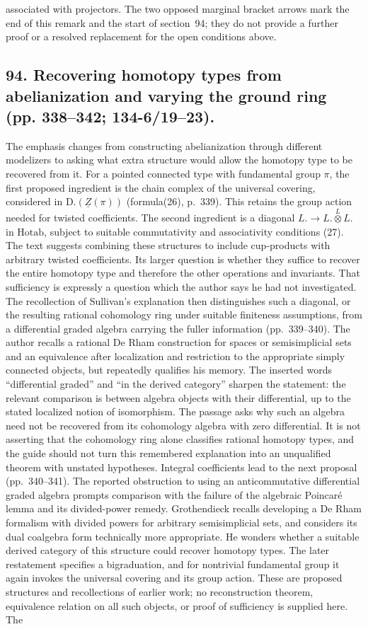 \documentclass[10pt,oneside]{book}
\begin{document}
associated with projectors. The two opposed marginal bracket arrows mark the end of this remark and the start of section~94; they do not provide a further proof or a resolved replacement for the open conditions above.

\subsection*{94. Recovering homotopy types from abelianization and varying the ground ring (pp. 338--342; 134-6/19--23).}
The emphasis changes from constructing abelianization through different modelizers to asking what extra structure would allow the homotopy type to be recovered from it. For a pointed connected type with fundamental group $\pi$, the first proposed ingredient is the chain complex of the universal covering, considered in $\mathrm{D.}(\underline Z(\pi))$ (formula(26), p.~339). This retains the group action needed for twisted coefficients. The second ingredient is a diagonal $L.\to L.\overset{L}{\otimes}L.$ in $\mathrm{Hotab}$, subject to suitable commutativity and associativity conditions (27). The text suggests combining these structures to include cup-products with arbitrary twisted coefficients. Its larger question is whether they suffice to recover the entire homotopy type and therefore the other operations and invariants. That sufficiency is expressly a question which the author says he had not investigated. The recollection of Sullivan's explanation then distinguishes such a diagonal, or the resulting rational cohomology ring under suitable finiteness assumptions, from a differential graded algebra carrying the fuller information (pp.~339--340). The author recalls a rational De Rham construction for spaces or semisimplicial sets and an equivalence after localization and restriction to the appropriate simply connected objects, but repeatedly qualifies his memory. The inserted words ``differential graded'' and ``in the derived category'' sharpen the statement: the relevant comparison is between algebra objects with their differential, up to the stated localized notion of isomorphism. The passage asks why such an algebra need not be recovered from its cohomology algebra with zero differential. It is not asserting that the cohomology ring alone classifies rational homotopy types, and the guide should not turn this remembered explanation into an unqualified theorem with unstated hypotheses. Integral coefficients lead to the next proposal (pp.~340--341). The reported obstruction to using an anticommutative differential graded algebra prompts comparison with the failure of the algebraic Poincar\'e lemma and its divided-power remedy. Grothendieck recalls developing a De Rham formalism with divided powers for arbitrary semisimplicial sets, and considers its dual coalgebra form technically more appropriate. He wonders whether a suitable derived category of this structure could recover homotopy types. The later restatement specifies a bigraduation, and for nontrivial fundamental group it again invokes the universal covering and its group action. These are proposed structures and recollections of earlier work; no reconstruction theorem, equivalence relation on all such objects, or proof of sufficiency is supplied here. The 
\end{document}
